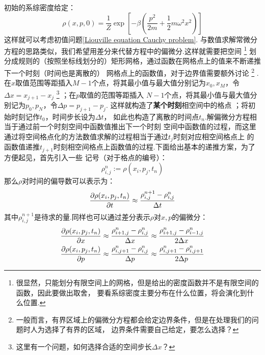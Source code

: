     初始的系综密度给定：
    \begin{equation}
        \rho(x, p, 0) = \frac{1}{Z}\exp\left[-\beta\left(\frac{p^2}{2m} + \frac{1}{2}m\omega^2x^2\right)\right]
    \end{equation}
    这样就可以考虑初值问题\ref{Liouville equation Cauchy problem}.
    与数值求解常微分方程的思路类似，我们希望用差分来代替方程中的偏微分.这样就需要把空间
    \footnote{
        很显然，只能划分有限空间上的网格，但是给出的密度函数并不是有限空间的函数，因此要做出取舍，
        要看系综密度主要分布在什么位置，将会演化到什么位置.
    }
    划分成规则的（按照坐标线划分的）矩形网格，通过函数在网格点上的值来不断递推下一个时刻（时间也是离散的）
    网格点上的函数值，对于边界值需要额外讨论
    \footnote{
        一般而言，有界区域上的偏微分方程都会给定边界条件，但是在处理我们的问题时人为选择了有界的区域，
        边界条件需要自己给定，要怎么选择？
    }
    .
    在$x$取值范围等距插入$M-1$个点，将其最小值与最大值分别记为$x_0, x_M$，令$\Delta x = x_{j+1} - x_j$
    \footnote{
        这里有一个问题，如何选择合适的空间步长$\Delta x$？
    }
    ；在$p$取值的范围等距插入
    $N-1$个点，将其最小值与最大值分别记为$p_0, p_N$，令$\Delta p = p_{j + 1} - p_j$.
    这样就构造了\textbf{某个时刻}相空间中的格点
    ；将初始时刻记作$t_0$，时间步长设为$\Delta t$，
    如此也构造了离散的时间点$t_n$.解偏微分方程相当于通过前一个时刻空间中函数值推出下一个时刻
    空间中函数值的过程，而这里通过将空间格点化的方法数值求解的过程相当于通过$t_j$时刻对应相空间格点上
    的函数值递推$t_{j+1}$时刻相空间格点上函数值的过程.下面给出基本的递推方案，为了方便起见，首先引入一些
    记号（对于格点的编号）：
    \begin{equation}
        \rho_{i, j}^{n} := \rho(x_i, p_j, t_n)
    \end{equation}
    那么$\rho$对时间的偏导数可以表示为：
    \begin{equation}
        \frac{\partial{\rho(x_i, p_j, t_n)}}{\partial{t}} \approx  \frac{\rho_{i, j}^{n + 1} - \rho_{i, j}^{n}}{\Delta t}
    \end{equation}
    其中$\rho_{i, j}^{n+1}$是待求的量.同样也可以通过差分表示$\rho$对$x, p$的偏微分：
    \begin{equation}
        \begin{split}
            \frac{\partial{\rho(x_i, p_j, t_n)}}{\partial{x}} &\approx \frac{\rho_{i + 1, j}^{n} - \rho_{i, j}^n}{\Delta x}
             \approx \frac{\rho_{i + 1, j}^{n} - \rho_{i-1, j}^n}{2\Delta x}\\
             \frac{\partial{\rho(x_i, p_j, t_n)}}{\partial{p}} &\approx \frac{\rho_{i, j+1}^{n} - \rho_{i, j}^n}{\Delta p}
             \approx \frac{\rho_{i, j+1}^{n} - \rho_{i, j+1}^n}{2\Delta p}
        \end{split}
    \end{equation}
